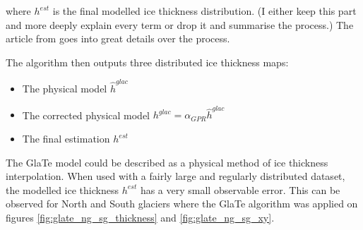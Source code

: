 \documentclass[a4, 12pt]{article}
\begin{document}
where $h^{est}$ is the final modelled ice thickness distribution. (I either keep this part and more deeply explain every term or drop it and summarise the process.) The article from \citeauthor{langhammer2019glacier} goes into great details over the process. 
 
The algorithm then outputs three distributed ice thickness maps:
\begin{itemize}
\item The physical model $\hat{h}^{glac}$
\item The corrected physical model $h^{glac} = \alpha_{GPR}\hat{h}^{glac}$
\item The final estimation $h^{est}$
\end{itemize}
The GlaTe model could be described as a physical method of ice thickness interpolation. When used with a fairly large and regularly distributed dataset, the modelled ice thickness $h^{est}$ has a very small observable error. This can be observed for North and South glaciers where the GlaTe algorithm was applied on figures \ref{fig:glate_ng_sg_thickness} and \ref{fig:glate_ng_sg_xy}.
\\
\end{document}
